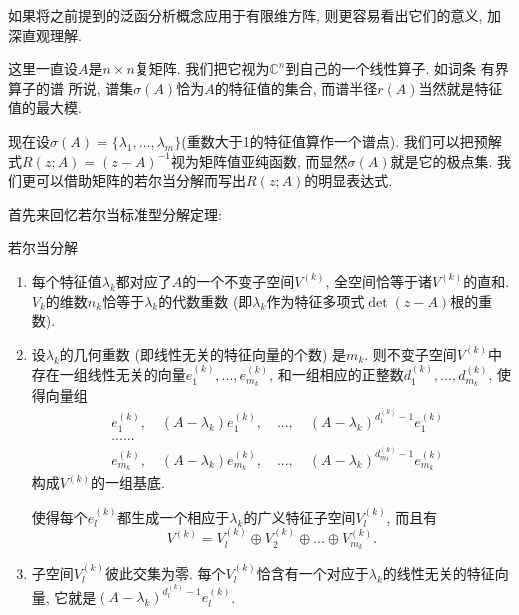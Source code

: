 

如果将之前提到的泛函分析概念应用于有限维方阵, 则更容易看出它们的意义, 加深直观理解. 

这里一直设$A$是$n\times n$复矩阵. 我们把它视为$\mathbb{C}^n$到自己的一个线性算子. 如词条 有界算子的谱 所说, 谱集$\sigma(A)$恰为$A$的特征值的集合, 而谱半径$r(A)$当然就是特征值的最大模. 

现在设$\sigma(A)=\{\lambda_1,...,\lambda_m\}$(重数大于1的特征值算作一个谱点). 我们可以把预解式$R(z;A)=(z-A)^{-1}$视为矩阵值亚纯函数, 而显然$\sigma(A)$就是它的极点集. 我们更可以借助矩阵的若尔当分解而写出$R(z;A)$的明显表达式. 

首先来回忆若尔当标准型分解定理:

\begin{theorem}{若尔当分解}
\begin{enumerate}
\item 每个特征值$\lambda_k$都对应了$A$的一个不变子空间$V^{(k)}$, 全空间恰等于诸$V^{(k)}$的直和. $V_k$的维数$n_k$恰等于$\lambda_k$的代数重数 (即$\lambda_k$作为特征多项式$\det(z-A)$根的重数).
\item 设$\lambda_k$的几何重数 (即线性无关的特征向量的个数) 是$m_k$. 则不变子空间$V^{(k)}$中存在一组线性无关的向量$e^{(k)}_1,...,e^{(k)}_{m_k}$, 和一组相应的正整数$d^{(k)}_1,...,d^{(k)}_{m_k}$, 使得向量组
$$
\begin{aligned}
&e^{(k)}_1,\quad(A-\lambda_k)e^{(k)}_1,\quad...,\quad(A-\lambda_k)^{d^{(k)}_1-1}e^{(k)}_1\\
&......\\
&e^{(k)}_{m_k},\quad(A-\lambda_k)e^{(k)}_{m_k},\quad...,\quad(A-\lambda_k)^{d^{(k)}_{m_k}-1}e^{(k)}_{m_k}
\end{aligned}
$$
构成$V^{(k)}$的一组基底.

使得每个$e^{(k)}_l$都生成一个相应于$\lambda_k$的广义特征子空间$V^{(k)}_l$, 而且有
$$
V^{(k)}=V^{(k)}_l\oplus V^{(k)}_2\oplus...\oplus V^{(k)}_{m_k}.
$$
\item 子空间$V^{(k)}_l$彼此交集为零. 每个$V^{(k)}_l$恰含有一个对应于$\lambda_k$的线性无关的特征向量, 它就是$(A-\lambda_k)^{d^{(k)}_l-1}e^{(k)}_l$.
\end{enumerate}
\end{theorem}
